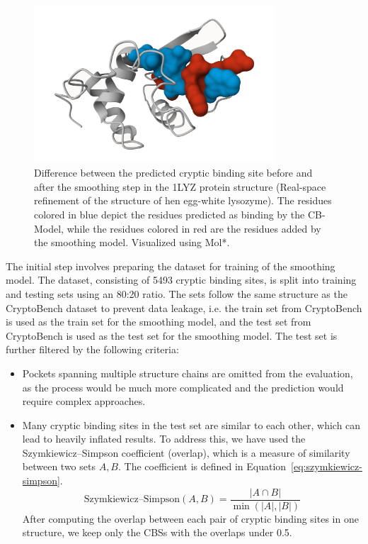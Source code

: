 \begin{figure}
    \centering
    \includegraphics[width=0.8\textwidth]{img/smoothing-difference.png}
    \caption{Difference between the predicted cryptic binding site before and after the smoothing step in the 1LYZ protein structure (Real-space refinement of the structure of hen egg-white lysozyme). The residues colored in blue depict the residues predicted as binding by the CB-Model, while the residues colored in red are the residues added by the smoothing model. Visualized using Mol*.}
    \label{fig:smoothing-difference}
\end{figure}

The initial step involves preparing the dataset for training of the smoothing model. The dataset, consisting of 5493 cryptic binding sites, is split into training and testing sets using an 80:20 ratio. The sets follow the same structure as the CryptoBench dataset to prevent data leakage, i.e. the train set from CryptoBench is used as the train set for the smoothing model, and the test set from CryptoBench is used as the test set for the smoothing model. The test set is further filtered by the following criteria:

\begin{itemize}
    \item Pockets spanning multiple structure chains are omitted from the evaluation, as the process would be much more complicated and the prediction would require complex approaches.
    \item Many cryptic binding sites in the test set are similar to each other, which can lead to heavily inflated results. To address this, we have used the Szymkiewicz–Simpson coefficient (overlap), which is a measure of similarity between two sets $A, B$. The coefficient is defined in Equation~\ref{eq:szymkiewicz-simpson}.
    \begin{equation}
        \text{Szymkiewicz–Simpson}(A, B) = \frac{|A \cap B|}{\min(|A|, |B|)}
        \label{eq:szymkiewicz-simpson}
    \end{equation}
    After computing the overlap between each pair of cryptic binding sites in one structure, we keep only the CBSs with the overlaps under 0.5.
\end{itemize}

